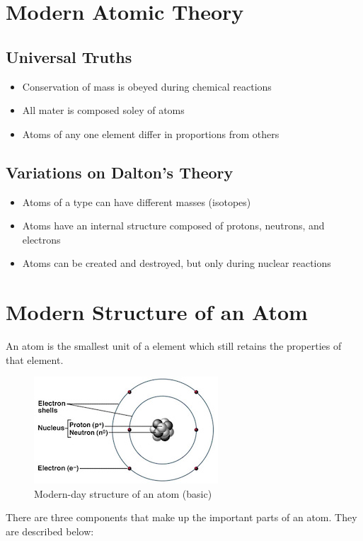 \section{Modern Atomic Theory}
\subsection{Universal Truths}
\begin{itemize}
  \item Conservation of mass is obeyed during chemical reactions
  \item All mater is composed soley of atoms
  \item Atoms of any one element differ in proportions from others
\end{itemize}
\subsection{Variations on Dalton's Theory}
\begin{itemize}
  \item Atoms of a type can have different masses (isotopes)
  \item Atoms have an internal structure composed of protons, neutrons, and
    electrons
  \item Atoms can be created and destroyed, but only during nuclear reactions
\end{itemize}

\section{Modern Structure of an Atom}
An atom is the smallest unit of a element which still retains the properties of
that element.

\begin{figure}[H]
  \centering
  \includegraphics{res/atom_structure.jpg}
  \caption{Modern-day structure of an atom (basic)}
\end{figure}

There are three components that make up the important parts of an atom.  They
are described below:

